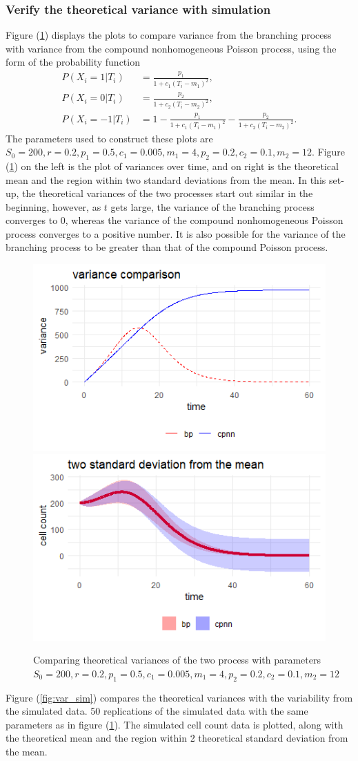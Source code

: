 \documentclass[11pt]{article}
\begin{document}
\subsubsection*{Verify the theoretical variance with simulation}
Figure (\ref{fig:var_compare}) displays the plots to compare variance from the branching process with variance from the compound nonhomogeneous Poisson process, using the form of the probability function 
\begin{equation}
    \begin{split}
        P(X_i = 1 \vert T_i) &= \frac{p_1}{1 + c_1 (T_i -m_1)^2}, \\
        P(X_i = 0 \vert T_i) & = \frac{p_2}{1 + c_2 (T_i - m_2)^2}, \\
        P(X_i = -1 \vert T_i ) & = 1- \frac{p_1}{1+c_1(T_i -m_1)^2} - \frac{p_2}{1 + c_2(T_i -m_2)^2}.
    \end{split}
\end{equation}
The parameters used to construct these plots are $S_0 = 200, r = 0.2, p_1 = 0.5, c_1 = 0.005, m_1 = 4, p_2 = 0.2, c_2 = 0.1, m_2 = 12$. Figure (\ref{fig:var_compare}) on the left is the plot of variances over time, and on right is the theoretical mean and the region within two standard deviations from the mean. In this set-up, the theoretical variances of the two processes start out similar in the beginning, however, as $t$ gets large, the variance of the branching process converges to 0, whereas the variance of the compound nonhomogeneous Poisson process converges to a positive number. It is also possible for the variance of the branching process to be greater than that of the compound Poisson process. 

\begin{figure}[!h]
    \centering
    \includegraphics[width=0.45\linewidth]{variance_comparison.png}
    \includegraphics[width=0.45\linewidth]{sdfrommean.png}
    \caption{Comparing theoretical variances of the two process with parameters $S_0 = 200, r = 0.2, p_1 = 0.5, c_1 = 0.005, m_1 = 4, p_2 = 0.2, c_2 = 0.1, m_2 = 12$}
    \label{fig:var_compare}
\end{figure}
Figure (\ref{fig:var_sim}) compares the theoretical variances with the variability from the simulated data. 50 replications of the simulated data with the same parameters as in figure (\ref{fig:var_compare}). The simulated cell count data is plotted, along with the theoretical mean and the region within 2 theoretical standard deviation from the mean. 
\end{document}
